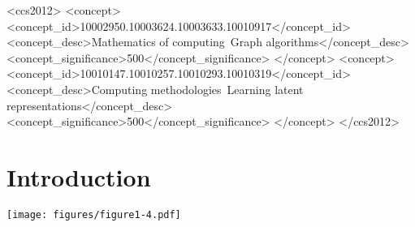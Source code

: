 \documentclass[sigconf]{acmart}
\newcommand{\company}{Alibaba}
\newcommand{\model}{{\em GATNE}}
\begin{document}
\begin{CCSXML}
	<ccs2012>
	<concept>
	<concept_id>10002950.10003624.10003633.10010917</concept_id>
	<concept_desc>Mathematics of computing~Graph algorithms</concept_desc>
	<concept_significance>500</concept_significance>
	</concept>
	<concept>
	<concept_id>10010147.10010257.10010293.10010319</concept_id>
	<concept_desc>Computing methodologies~Learning latent representations</concept_desc>
	<concept_significance>500</concept_significance>
	</concept>
	</ccs2012>

\end{CCSXML}



\maketitle


\section{Introduction}\label{sec:intro}


\begin{figure*}[t]
	\centering
	\texttt{[image: figures/figure1-4.pdf]}
    \caption{The left illustrates an example of an attributed multiplex heterogeneous network. Users in the left part of the figure are associated with attributes, including gender, age, and location. Similarly, items in the left part of the figure include attributes such as price and brand. The edge types between users and items are from four interactions, including \textit{click}, \textit{add-to-preference}, \textit{add-to-cart} and \textit{conversion}. The three subfigures in the middle represent three different ways of setting up the graphs, including HON, MHEN, and AMHEN from the bottom to the top. The right part shows the performance improvement of the proposed models over DeepWalk
on the \company\ dataset. As can be seen, \model-I achieves a +28.23\%  performance lift compared to DeepWalk.} 
	\label{fig:user_item}
\end{figure*}
\end{document}

